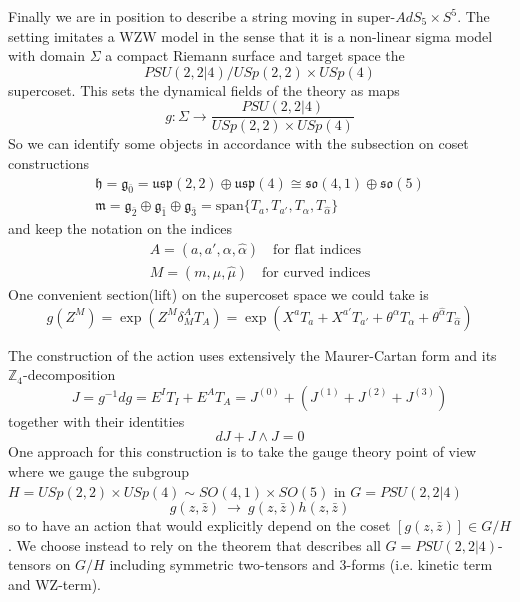 \documentclass[a4paper,12pt]{article}
\numberwithin{equation}{section}
\numberwithin{thm}{section}
\numberwithin{exm}{section}
\newcommand{\str}{\mathrm{Str}}
\newcommand{\lra}{\longrightarrow}
\newcommand{\mo}{^{-1}}
\newcommand{\Z}{{\mathbb Z}}
\newcommand{\we}{{\wedge}}
\newcommand{\ads}{{AdS_5\times S^5}}
\newcommand{\zb}{{\bar z}}
\newcommand{\<}{{\langle}}
\renewcommand{\>}{{\rangle}}
\newcommand{\mf}{\mathfrak}
\renewcommand{\a}{{\alpha}}
\newcommand{\ah}{{\widehat\alpha}}
\renewcommand{\d}{{\delta}}
\newcommand{\m}{{\mu}}
\newcommand{\mh}{{\widehat\mu}}
\newcommand{\Om}{{\Omega}}
\renewcommand{\S}{{\Sigma}}
\renewcommand{\t}{{\theta}}
\begin{document}
Finally we are in position to describe a string moving in super-$\ads$. The setting imitates a WZW model in the sense that it is a non-linear sigma model with domain $\S$ a compact Riemann surface and target space the $$ PSU(2,2|4)/USp(2,2)\times USp(4)$$ supercoset. This sets the dynamical fields of the theory as maps
	\begin{equation}
	g:\S \rightarrow \frac{PSU(2,2|4)}{USp(2,2)\times USp(4)}
	\end{equation}
So we can identify some objects in accordance with the subsection on coset constructions
	\begin{equation}
		\begin{array}{l}
		\mf{h} = \mf{g}_{\bar 0} = \mf{usp}(2,2)\oplus \mf{usp}(4) \cong \mf{so}(4,1)\oplus \mf{so}(5)\\
		\mf{m} = \mf g_{\bar 2}\oplus \mf g_{\bar 1} \oplus \mf g_{\bar 3} = \text{span}\{T_a, T_{a'}, T_\a, T_\ah\}
		\end{array}
	\end{equation}
and keep the notation on the indices
	\begin{equation}
		\begin{array}{l}
		A = (a, a', \a, \ah)\quad\text{for flat indices} \\
		M = (m, \m, \mh)\quad\text{for curved indices}
		\end{array}
	\end{equation}
One convenient section(lift) on the supercoset space we could take is
	\begin{equation}
	g(Z^M) = \exp(Z^M \d^A_M T_A) = \exp(X^a T_a + X^{a'} T_{a'} + \t^\a T_\a + \t^\ah T_\ah)
	\end{equation}


The construction of the action uses extensively the Maurer-Cartan form and its $\Z_4$-decomposition
	\begin{equation}
	J = g\mo dg = E^I T_I + E^A T_A = J^{(0)} + (J^{(1)} + J^{(2)} + J^{(3)})
	\end{equation}
together with their identities
	\begin{equation}
	d J + J\we J = 0
	\end{equation}
One approach for this construction is to take the gauge theory point of view where we gauge the subgroup $H = USp(2,2) \times USp(4) \sim SO(4,1) \times SO(5)$ in $G = PSU(2,2|4)$
	\begin{equation}
	g(z,\zb)\ \lra\ g(z,\zb) h(z,\zb)
	\end{equation}
so to have an action that would explicitly depend on the coset $[g(z,\zb)]\in G/H$. We choose instead to rely on the theorem that describes all $G= PSU(2,2|4)$-tensors on $G/H$ including symmetric two-tensors and 3-forms (i.e. kinetic term and WZ-term).
\end{document}
